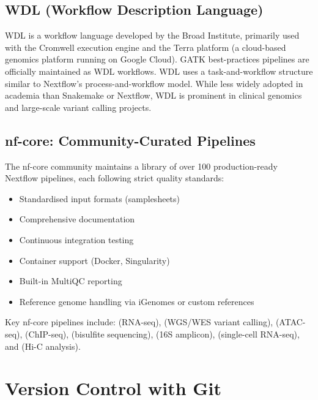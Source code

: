 \subsection{WDL (Workflow Description Language)}
\label{subsec:bioinf:wdl}

WDL is a workflow language developed by the Broad Institute, primarily used with the Cromwell execution engine and the Terra platform (a cloud-based genomics platform running on Google Cloud). GATK best-practices pipelines are officially maintained as WDL workflows. WDL uses a task-and-workflow structure similar to Nextflow's process-and-workflow model. While less widely adopted in academia than Snakemake or Nextflow, WDL is prominent in clinical genomics and large-scale variant calling projects.

\subsection{nf-core: Community-Curated Pipelines}
\label{subsec:bioinf:nfcore}

The nf-core community maintains a library of over 100 production-ready Nextflow pipelines, each following strict quality standards:

\begin{itemize}[itemsep=2pt]
  \item Standardised input formats (samplesheets)
  \item Comprehensive documentation
  \item Continuous integration testing
  \item Container support (Docker, Singularity)
  \item Built-in MultiQC reporting
  \item Reference genome handling via iGenomes or custom references
\end{itemize}

Key nf-core pipelines include:  (RNA-seq),  (WGS/WES variant calling),  (ATAC-seq),  (ChIP-seq),  (bisulfite sequencing),  (16S amplicon),  (single-cell RNA-seq), and  (Hi-C analysis).

\section{Version Control with Git}
\label{sec:bioinf:git}

